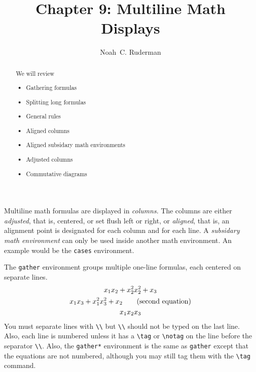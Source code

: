 \documentclass[12pt]{amsart}
\begin{document}
	\title{Chapter 9: Multiline Math Displays}
	\author[N.\, C. Ruderman]{Noah~C. Ruderman}

	\begin{abstract}
		We will review
		\begin{center}
		\begin{itemize}
			\item Gathering formulas
			\item Splitting long formulas
			\item General rules
			\item Aligned columns
			\item Aligned subsidary math environments
			\item Adjusted columns
			\item Commutative diagrams
		\end{itemize}
		\end{center}
	\end{abstract}

	\maketitle 

Multiline math formulas are displayed in \emph{columns.} The columns are either \emph{adjusted}, that is, centered, or set flush left or right, or \emph{aligned}, that is, an alignment point is designated for each column and for each line. A \emph{subsidary math environment} can only be used inside another math environment. An example would be the \texttt{cases} environment.
\vspace{15 pt}

The \texttt{gather} environment groups multiple one-line formulas, each centered on separate lines.
\begin{gather}
   x_1 x_2 + x_2^2 x_2^2 + x_3 \notag \\
   x_1 x_3 + x_1^2 x_3^2 + x_2 \tag{second equation}\\
   x_1 x_2 x_3
\end{gather}
You must separate lines with \verb+\\+ but \verb+\\+ should not be typed on the last line. Also, each line is numbered unless it has a \verb+\tag+ or \verb+\notag+ on the line before the separator \verb+\\+. Also, the \verb+gather*+ environment is the same as \verb+gather+ except that the equations are not numbered, although you may still tag them with the \verb+\tag+ command.
\vspace{15 pt}
\end{document}
